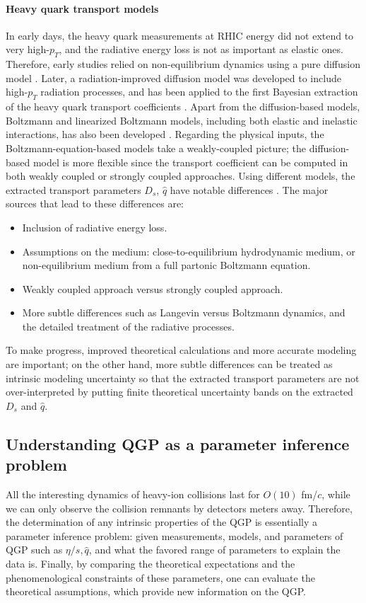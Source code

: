 \paragraph{Heavy quark transport models}
In early days, the heavy quark measurements at RHIC energy did not extend to very high-$p_T$, and the radiative energy loss is not as important as elastic ones.
Therefore, early studies relied on non-equilibrium dynamics using a pure diffusion model \cite{Moore:2004tg,vanHees:2007me}. 
Later, a radiation-improved diffusion model was developed \cite{Cao:2013ita} to include high-$p_T$ radiation processes, and has been applied to the first Bayesian extraction of the heavy quark transport coefficients \cite{Xu:2017obm}.
Apart from the diffusion-based models, Boltzmann and linearized Boltzmann models, including both elastic and inelastic interactions, has also been developed \cite{Scardina:2017ipo,Cao:2017hhk,Ke:2018tsh}.
Regarding the physical inputs, the Boltzmann-equation-based models take a weakly-coupled picture; the diffusion-based model is more flexible since the transport coefficient can be computed in both weakly coupled or strongly coupled approaches.
Using different models, the extracted transport parameters $D_s$, $\hat{q}$ have notable differences \cite{Rapp:2018qla,PhysRevC.99.014902,Cao:2018ews}.
The major sources that lead to these differences are:
\begin{itemize}
\item Inclusion of radiative energy loss.
\item Assumptions on the medium: close-to-equilibrium hydrodynamic medium, or non-equilibrium medium from a full partonic Boltzmann equation.
\item Weakly coupled approach versus strongly coupled approach.
\item More subtle differences such as Langevin versus Boltzmann dynamics, and the detailed treatment of the radiative processes.
\end{itemize}
To make progress, improved theoretical calculations and more accurate modeling are important; on the other hand, more subtle differences can be treated as intrinsic modeling uncertainty so that the extracted transport parameters are not over-interpreted by putting finite theoretical uncertainty bands on the extracted $D_s$ and $\hat{q}$. 

\subsection{Understanding QGP as a parameter inference problem}
All the interesting dynamics of heavy-ion collisions last for $O(10) $ fm/$c$, while we can only observe the collision remnants by detectors meters away.
Therefore, the determination of any intrinsic properties of the QGP is essentially  a parameter inference problem:
given measurements, models, and parameters of QGP such as $\eta/s, \hat{q}$, and what the favored range of parameters to explain the data is.
Finally, by comparing the theoretical expectations and the phenomenological constraints of these parameters, one can evaluate the theoretical assumptions, which provide new information on the QGP.

